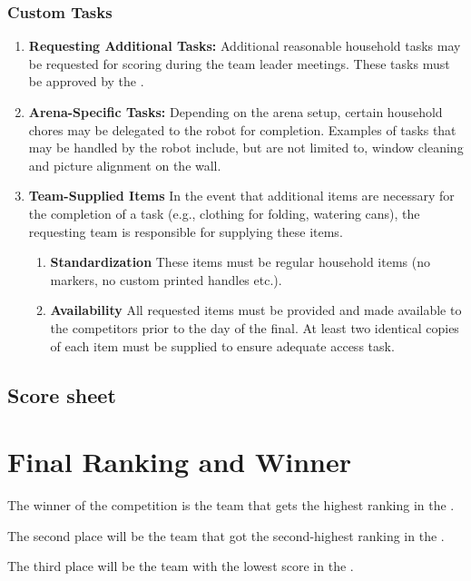 \subsubsection{Custom Tasks}
\begin{enumerate}[nosep]
\item \textbf{Requesting Additional Tasks:} Additional reasonable household tasks may be requested for scoring during the team leader meetings. These tasks must be approved by the \TC{}.

\item \textbf{Arena-Specific Tasks:} Depending on the arena setup, certain household chores may be delegated to the robot for completion. Examples of tasks that may be handled by the robot include, but are not limited to, window cleaning and picture alignment on the wall.

\item \textbf{Team-Supplied Items} In the event that additional items are necessary for the completion of a task (e.g., clothing for folding, watering cans), the requesting team is responsible for supplying these items.
\begin{enumerate}[nosep]
  \item \textbf{Standardization} These items must be regular household items (no markers, no custom printed handles etc.).
  \item \textbf{Availability} All requested items must be provided and made available to the competitors prior to the day of the final. At least two identical copies of each item must be supplied to ensure adequate access task.
\end{enumerate}
\end{enumerate}

\subsection*{Score sheet}


\section{Final Ranking and Winner}

The winner of the competition is the team that gets the highest ranking in the .

The second place will be the team that got the second-highest ranking in the .

The third place will be the team with the lowest score in the .


